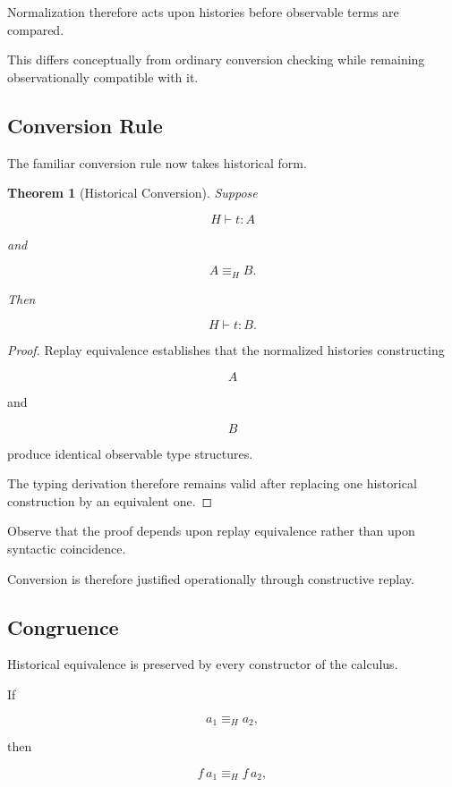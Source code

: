 \documentclass[12pt,oneside]{article}
\newtheorem{theorem}{Theorem}[section]
\theoremstyle{definition}
\theoremstyle{remark}
\begin{document}
Normalization therefore acts upon histories before observable terms are
compared.

This differs conceptually from ordinary conversion checking while remaining
observationally compatible with it.

\subsection{Conversion Rule}

The familiar conversion rule now takes historical form.

\begin{theorem}[Historical Conversion]

Suppose

\[
H
\vdash
t:A
\]

and

\[
A
\equiv_H
B.
\]

Then

\[
H
\vdash
t:B.
\]

\end{theorem}

\begin{proof}

Replay equivalence establishes that the normalized histories constructing

\[
A
\]

and

\[
B
\]

produce identical observable type structures.

The typing derivation therefore remains valid after replacing one historical
construction by an equivalent one.

\end{proof}

Observe that the proof depends upon replay equivalence rather than upon
syntactic coincidence.

Conversion is therefore justified operationally through constructive replay.

\subsection{Congruence}

Historical equivalence is preserved by every constructor of the calculus.

If

\[
a_1
\equiv_H
a_2,
\]

then

\[
f\,a_1
\equiv_H
f\,a_2,
\]
\end{document}
